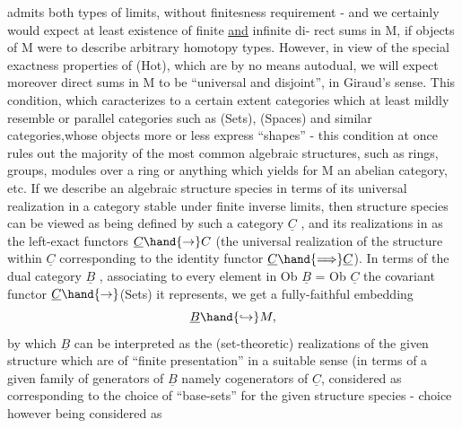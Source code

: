 
admits both types of limits,  without finitesness requirement  -  and
we certainly would expect  at least existence of finite \uline{and} infinite di-%
rect sums in M,  if objects of M were to describe arbitrary homotopy
types.  However,  in view of the special exactness properties of (Hot),
which are by no means autodual,  we will expect moreover direct sums in
M to be ``universal and disjoint'',  in Giraud's sense.  This condition,
which caracterizes to a certain extent categories which at least mildly
resemble or parallel  categories such as (Sets), (Spaces) and similar
categories,whose objects more or less express ``shapes'' -  this condition
at once rules out the majority of the most common algebraic structures,
such as rings,  groups, modules over a ring or anything which
yields for M an abelian category,  etc.  If we describe an algebraic
structure species in terms of its universal realization in a category
stable under finite inverse limits,  then  structure species can be
viewed as being defined by such a category $\underline{C}$ , and its realizations in
  as the left-exact functors $\underline{C}\hand{\to}C$ (the universal realization of the
structure within $\underline{C}$  corresponding to the identity functor $\underline{C}\hand{\Longrightarrow}\underline{C}$).  In
terms of the dual category $\underline{B}$ ,  associating to every element in
Ob $\underline{B}$  =  Ob $\underline{C}$  the covariant functor $\underline{C}\hand{\to}$(Sets) it represents,  we get
a fully-faithful embedding
\[ \underline{B}\hand{\hookrightarrow} M , \]
by which $\underline{B}$ can be interpreted as the  (set-theoretic) realizations of
the given structure  which are of ``finite presentation'' in a suitable
sense (in terms of a given family of generators of $\underline{B}$ namely cogenerators
of $\underline{C}$,  considered as corresponding to the choice of ``base-sets'' for the
given structure species  -   choice however being considered as
